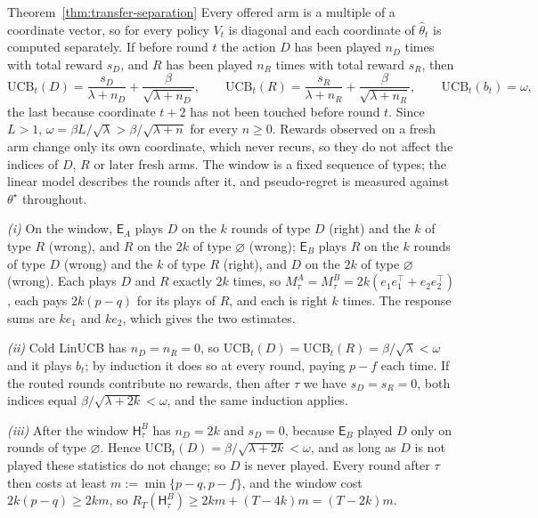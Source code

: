 \documentclass[anon]{alt2027} %
\newcommand{\Exp}{\mathsf{E}}
\newcommand{\Hyb}{\mathsf{H}}
\begin{document}
\begin{proofof}{Theorem~\ref{thm:transfer-separation}}
Every offered arm is a multiple of a coordinate vector, so for every policy
$V_t$ is diagonal and each coordinate of $\widehat\theta_t$ is computed
separately. If before round $t$ the action $D$ has been played $n_D$ times with
total reward $s_D$, and $R$ has been played $n_R$ times with total reward
$s_R$, then
\[
\mathrm{UCB}_t(D)=\frac{s_D}{\lambda+n_D}+\frac{\beta}{\sqrt{\lambda+n_D}},\qquad
\mathrm{UCB}_t(R)=\frac{s_R}{\lambda+n_R}+\frac{\beta}{\sqrt{\lambda+n_R}},\qquad
\mathrm{UCB}_t(b_t)=\omega,
\]
the last because coordinate $t+2$ has not been touched before round $t$.
Since $L>1$, $\omega=\beta L/\sqrt\lambda>\beta/\sqrt{\lambda+n}$ for every
$n\ge0$. Rewards observed on a fresh arm change only its own coordinate, which
never recurs, so they do not affect the indices of $D$, $R$ or later fresh
arms. The window is a fixed sequence of types; the linear model describes the
rounds after it, and pseudo-regret is measured against $\theta^\star$
throughout.

\emph{(i)} On the window, $\Exp_A$ plays $D$ on the $k$ rounds of type $D$
(right) and the $k$ of type $R$ (wrong), and $R$ on the $2k$ of type
$\varnothing$ (wrong); $\Exp_B$ plays $R$ on the $k$ rounds of type $D$ (wrong)
and the $k$ of type $R$ (right), and $D$ on the $2k$ of type $\varnothing$
(wrong). Each plays $D$ and $R$ exactly $2k$ times, so
$M^A_\tau=M^B_\tau=2k(e_1e_1^\top+e_2e_2^\top)$, each pays $2k(p-q)$ for its
plays of $R$, and each is right $k$ times. The response sums are $ke_1$ and
$ke_2$, which gives the two estimates.

\emph{(ii)} Cold LinUCB has $n_D=n_R=0$, so $\mathrm{UCB}_t(D)=\mathrm{UCB}_t(R)
=\beta/\sqrt\lambda<\omega$ and it plays $b_t$; by induction it does so at every
round, paying $p-f$ each time. If the routed rounds contribute no rewards, then
after $\tau$ we have $s_D=s_R=0$, both indices equal $\beta/\sqrt{\lambda+2k}<\omega$,
and the same induction applies.

\emph{(iii)} After the window $\Hyb^B_\tau$ has $n_D=2k$ and $s_D=0$, because
$\Exp_B$ played $D$ only on rounds of type $\varnothing$. Hence
$\mathrm{UCB}_t(D)=\beta/\sqrt{\lambda+2k}<\omega$, and as long as $D$ is not
played these statistics do not change; so $D$ is never played. Every round
after $\tau$ then costs at least $m:=\min\{p-q,p-f\}$, and the window cost
$2k(p-q)\ge2km$, so $R_T(\Hyb^B_\tau)\ge2km+(T-4k)m=(T-2k)m$.


\end{proofof}
\end{document}

